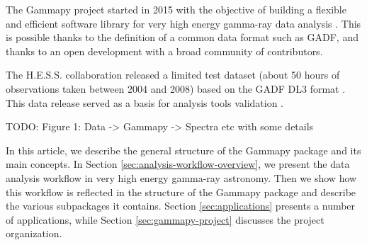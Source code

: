 The Gammapy project started in 2015 with the objective of building a flexible and
efficient software library for very high energy gamma-ray data analysis \citep{gammapy_2015}.
This is possible thanks to the definition of a common data format such as GADF, and thanks to
an open development with a broad community of contributors.



The H.E.S.S. collaboration released a limited test dataset (about 50 hours of
observations taken between 2004 and 2008) based  on the GADF DL3 format \citep{HESS_DR1}.
This data release served as a basis for analysis tools validation \cite[see e.g.]{Mohrmann2019}.

TODO: Figure 1: Data -> Gammapy -> Spectra etc with some details

In this article, we describe the general structure of the Gammapy package and
its main concepts. In Section \ref{sec:analysis-workflow-overview}, we present
the data analysis workflow in very high energy gamma-ray astronomy. Then we
show how this workflow is reflected in the structure of the Gammapy package and
describe the various subpackages it contains. Section \ref{sec:applications}
presents a number of applications, while Section \ref{sec:gammapy-project}
discusses the project organization.


